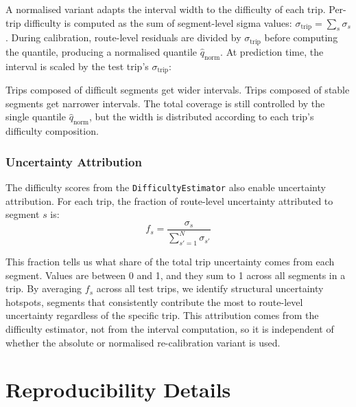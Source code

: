 \documentclass[12pt, a4paper, oneside]{report}
\begin{document}
A normalised variant adapts the interval width to the difficulty of each trip. Per-trip difficulty is computed as the sum of segment-level sigma values: $\sigma_{\text{trip}} = \sum_s \sigma_s$. During calibration, route-level residuals are divided by $\sigma_{\text{trip}}$ before computing the quantile, producing a normalised quantile $\hat{q}_{\text{norm}}$. At prediction time, the interval is scaled by the test trip's $\sigma_{\text{trip}}$:
\begin{equation}
    [\hat{T}_{\text{route}} - \hat{q}_{\text{norm}} \cdot \sigma_{\text{trip}},\; \hat{T}_{\text{route}} + \hat{q}_{\text{norm}} \cdot \sigma_{\text{trip}}]
\end{equation}

Trips composed of difficult segments get wider intervals. Trips composed of stable segments get narrower intervals. The total coverage is still controlled by the single quantile $\hat{q}_{\text{norm}}$, but the width is distributed according to each trip's difficulty composition.

\subsubsection{Uncertainty Attribution}

The difficulty scores from the \texttt{DifficultyEstimator} also enable uncertainty attribution. For each trip, the fraction of route-level uncertainty attributed to segment $s$ is:
\begin{equation}
    f_s = \frac{\sigma_s}{\sum_{s'=1}^{N} \sigma_{s'}}
    \label{eq:attribution}
\end{equation}

This fraction tells us what share of the total trip uncertainty comes from each segment. Values are between 0 and 1, and they sum to 1 across all segments in a trip. By averaging $f_s$ across all test trips, we identify structural uncertainty hotspots, segments that consistently contribute the most to route-level uncertainty regardless of the specific trip. This attribution comes from the difficulty estimator, not from the interval computation, so it is independent of whether the absolute or normalised re-calibration variant is used.


\section{Reproducibility Details}
\label{sec:reproducibility}
\end{document}
